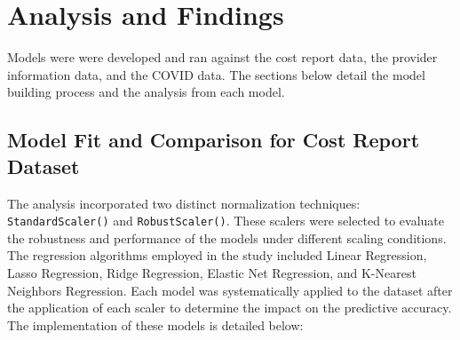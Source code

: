 \documentclass{article}
\theoremstyle{mytheoremstyle}
\theoremstyle{mytheoremstyle}
\theoremstyle{myproblemstyle}
\begin{document}
\pagebreak
\section{Analysis and Findings}

Models were were developed and ran against the cost report data, the provider information data, and the COVID data. The sections below detail the model building process and the analysis from each model.

\subsection{Model Fit and Comparison for Cost Report Dataset}
The analysis incorporated two distinct normalization techniques: \texttt{StandardScaler()} and \texttt{RobustScaler()}. These scalers were selected to evaluate the robustness and performance of the models under different scaling conditions. The regression algorithms employed in the study included Linear Regression, Lasso Regression, Ridge Regression, Elastic Net Regression, and K-Nearest Neighbors Regression. Each model was systematically applied to the dataset after the application of each scaler to determine the impact on the predictive accuracy. The implementation of these models is detailed below:
\end{document}
